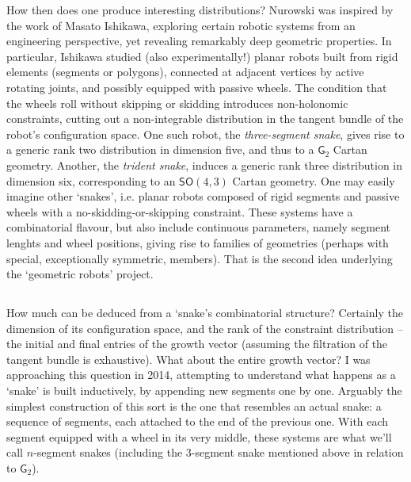 How then does one produce interesting distributions? Nurowski was inspired by the work of Masato Ishikawa,
exploring certain robotic systems from an engineering perspective, yet revealing remarkably deep geometric
properties. In particular, Ishikawa studied (also experimentally!) planar robots built from rigid elements
(segments or polygons), connected at adjacent vertices by active rotating joints, and possibly equipped
with passive wheels. The condition that the wheels roll without skipping or skidding introduces non-holonomic
constraints, cutting out a non-integrable distribution in the tangent bundle of the robot's configuration space.
One such robot, the \emph{three-segment snake}, gives rise to a generic rank two distribution in dimension five,
and thus to a $\mathsf{G}_2$ Cartan geometry. Another, the \emph{trident snake}, induces a generic rank three
distribution in dimension six, corresponding to an $\mathsf{SO}(4,3)$ Cartan geometry. 
One may easily imagine other `snakes', i.e. planar robots
composed of rigid segments and passive wheels with a no-skidding-or-skipping constraint. These systems have
a combinatorial flavour, but also include continuous parameters, 
namely segment lenghts and wheel positions, giving rise to
families of geometries (perhaps with special, exceptionally symmetric, members). That is the second idea underlying the `geometric robots' project.

\subsection{}\label{subsec:table}
How much can be deduced from a `snake's combinatorial structure? Certainly the dimension of its configuration
space, and the rank of the constraint distribution -- the initial and final entries of the growth vector (assuming the filtration of the tangent bundle is exhaustive). What about the entire growth vector? I was approaching
this question in 2014, attempting to understand what happens as a `snake' is built inductively, by appending
new segments one by one. Arguably the simplest construction of this sort is the one that resembles
an actual snake: a sequence of segments, each attached to the end of the previous one. With each segment
equipped with a wheel in its very middle, these systems are what we'll call $n$-segment snakes (including
the $3$-segment snake mentioned above in relation to $\mathsf{G}_2$).

